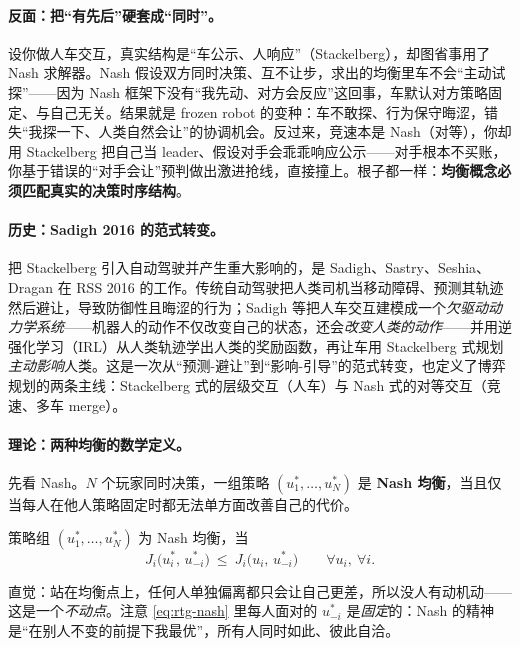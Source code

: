 \paragraph{反面：把“有先后”硬套成“同时”。}
设你做人车交互，真实结构是“车公示、人响应”（Stackelberg），却图省事用了 Nash 求解器。Nash 假设双方同时决策、互不让步，求出的均衡里车不会“主动试探”——因为 Nash 框架下没有“我先动、对方会反应”这回事，车默认对方策略固定、与自己无关。结果就是 frozen robot 的变种：车不敢探、行为保守晦涩，错失“我探一下、人类自然会让”的协调机会。反过来，竞速本是 Nash（对等），你却用 Stackelberg 把自己当 leader、假设对手会乖乖响应公示——对手根本不买账，你基于错误的“对手会让”预判做出激进抢线，直接撞上。根子都一样：\textbf{均衡概念必须匹配真实的决策时序结构}。

\paragraph{历史：Sadigh 2016 的范式转变。}
把 Stackelberg 引入自动驾驶并产生重大影响的，是 Sadigh、Sastry、Seshia、Dragan 在 RSS 2016 的工作\cite{sadigh2016planning}。传统自动驾驶把人类司机当移动障碍、预测其轨迹然后避让，导致防御性且晦涩的行为；Sadigh 等把人车交互建模成一个\emph{欠驱动动力学系统}——机器人的动作不仅改变自己的状态，还会\emph{改变人类的动作}——并用逆强化学习（IRL）从人类轨迹学出人类的奖励函数，再让车用 Stackelberg 式规划\emph{主动影响}人类。这是一次从“预测-避让”到“影响-引导”的范式转变，也定义了博弈规划的两条主线：Stackelberg 式的层级交互（人车）与 Nash 式的对等交互（竞速、多车 merge）。

\paragraph{理论：两种均衡的数学定义。}
先看 Nash。$N$ 个玩家同时决策，一组策略 $(u_1^*,\dots,u_N^*)$ 是 \textbf{Nash 均衡}，当且仅当每人在他人策略固定时都无法单方面改善自己的代价。

\begin{definition}[Nash 均衡]\label{def:rtg-nash}
策略组 $(u_1^*,\dots,u_N^*)$ 为 Nash 均衡，当
\begin{equation}
  J_i\big(u_i^*,\,u_{-i}^*\big)\ \le\ J_i\big(u_i,\,u_{-i}^*\big)\qquad\forall u_i,\ \forall i.
  \label{eq:rtg-nash}
\end{equation}
\end{definition}

\noindent 直觉：站在均衡点上，任何人单独偏离都只会让自己更差，所以没人有动机动——这是一个\emph{不动点}\cite{sadigh2016planning}。注意 \cref{eq:rtg-nash} 里每人面对的 $u_{-i}^*$ 是\emph{固定}的：Nash 的精神是“在别人不变的前提下我最优”，所有人同时如此、彼此自洽。

